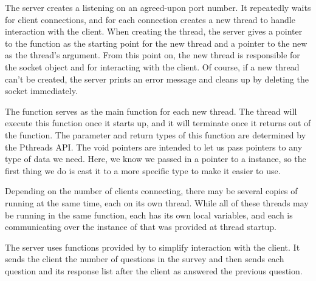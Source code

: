 \begin{topcode}

The server creates a  listening on an
agreed-upon port number.  It repeatedly waits for client connections,
and for each connection creates a new thread to handle interaction
with the client.  When creating the thread, the server gives a pointer
to the  function as the starting point for the new thread
and a pointer to the new  as the thread's argument.  From this
point on, the new thread is responsible for the socket object and for
interacting with the client.  Of course, if a new thread can't be
created, the server prints an error message and cleans up by deleting
the socket immediately.


The  function serves as the main function for
each new thread.  The thread will execute this function once it starts
up, and it will terminate once it returns out of the function.  The
parameter and return types of this function are determined by the
Pthreads API.  The void pointers are intended to let us pass 
pointers to any type of data we need.  Here, we know we passed in a
pointer to a  instance, so the first thing we do is
cast it to a more specific type to make it easier to use.

Depending on the number of clients connecting, there may be several
copies of  running at the same time, each on its
own thread.  While all of these threads may be running in the same
function, each has its own local variables, and each is communicating
over the instance of  that was provided at thread
startup.


\begin{bottomcode}


The server uses functions provided by  to
simplify interaction with the client.  It sends the client the number
of questions in the survey and then sends each question and its
response list after the client as answered the previous question.



\end{bottomcode}
\end{topcode}
